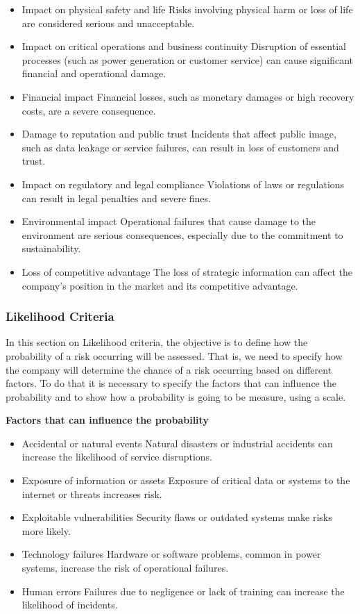 \begin{itemize}
    \item Impact on physical safety and life \- Risks involving physical harm or loss of life are considered serious and unacceptable.
    \item Impact on critical operations and business continuity \- Disruption of essential processes (such as power generation or customer service) can cause significant financial and operational damage.
    \item Financial impact \- Financial losses, such as monetary damages or high recovery costs, are a severe consequence.
    \item Damage to reputation and public trust \- Incidents that affect public image, such as data leakage or service failures, can result in loss of customers and trust.
    \item Impact on regulatory and legal compliance \- Violations of laws or regulations can result in legal penalties and severe fines.
    \item Environmental impact \- Operational failures that cause damage to the environment are serious consequences, especially due to the commitment to sustainability.
    \item Loss of competitive advantage \- The loss of strategic information can affect the company's position in the market and its competitive advantage.    
\end{itemize}

\subsubsection{Likelihood Criteria}

In this section on Likelihood criteria, the objective is to define how the probability of a risk occurring will be assessed. That is, we need to specify how the company will determine the chance of a risk occurring based on different factors. To do that it is necessary to specify the factors that can influence the probability and to show how a probability is going to be measure, using a scale.

\textbf{Factors that can influence the probability}

\begin{itemize}
    \item Accidental or natural events \- Natural disasters or industrial accidents can increase the likelihood of service disruptions.
    \item Exposure of information or assets \- Exposure of critical data or systems to the internet or threats increases risk.
    \item Exploitable vulnerabilities \- Security flaws or outdated systems make risks more likely.
    \item Technology failures \- Hardware or software problems, common in power systems, increase the risk of operational failures.
    \item Human errors \- Failures due to negligence or lack of training can increase the likelihood of incidents.    
\end{itemize}

